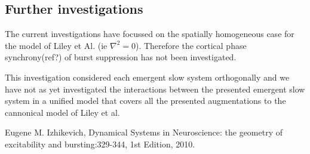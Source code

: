 \documentclass[a4paper,12pt]{article}
\begin{document}
\subsection{Further investigations}
The current investigations have focussed on the spatially homogeneous case for the model of Liley et Al. (ie $\nabla^2 =
0$). Therefore the cortical phase synchrony(ref?) of burst suppression has not been investigated.

This investigation considered each emergent slow system orthogonally and we have not as yet investigated the
interactions between the presented emergent slow system in a unified model that covers all the presented augmentations to the cannonical model of Liley et al.


\begin{thebibliography}{999}

  Eugene M. Izhikevich,
  Dynamical Systems in Neuroscience: the geometry of excitability and bursting:329-344,
  1st Edition,
  2010.

\end{thebibliography}
\end{document}
